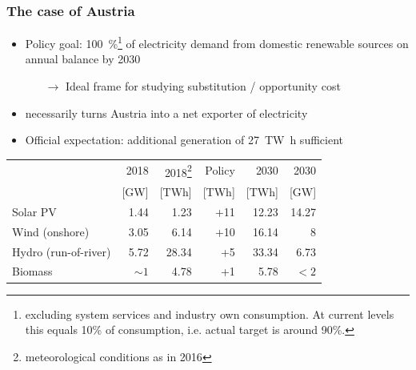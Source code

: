 \documentclass[aspectratio=1610, xcolor=dvipsnames,handout]{beamer} %
\begin{document}
    \begin{frame}
        \frametitle{The case of Austria}
        \begin{itemize}
            \item Policy goal: \SI{100}{\percent}\footnote[frame]{excluding system services and industry own consumption.
            At current levels this equals 10\% of consumption, i.e. actual target is around 90\%.} of electricity demand from
            domestic renewable sources on annual balance by 2030
            \begin{itemize}
                \item[$\rightarrow$] Ideal frame for studying substitution / opportunity cost
            \end{itemize}
            \item necessarily turns Austria into a net exporter of electricity
            \item Official expectation: additional generation of \SI{27}{\tera\watt\hour} sufficient
        \end{itemize}
        \begin{table}
            \centering
            \begin{tabular}{| l | r | r | r | r | r |}
                \hline
                & 2018 & 2018\footnote[frame]{meteorological conditions as in 2016} & Policy & 2030 & 2030 \\
                & [GW] & [TWh] & [TWh] & [TWh] & [GW] \\ \hline \hline
                Solar PV & 1.44 & 1.23 & +11 & 12.23 & 14.27 \\ \hline
                Wind (onshore) & 3.05 & 6.14 & +10 & 16.14 & 8 \\ \hline
                Hydro (run-of-river) & 5.72 & 28.34 & +5 & 33.34 & 6.73 \\ \hline
                Biomass & $\sim 1$ & 4.78 & +1 & 5.78 & $<2$ \\ \hline
            \end{tabular}
        \end{table}
    \end{frame}
\end{document}

